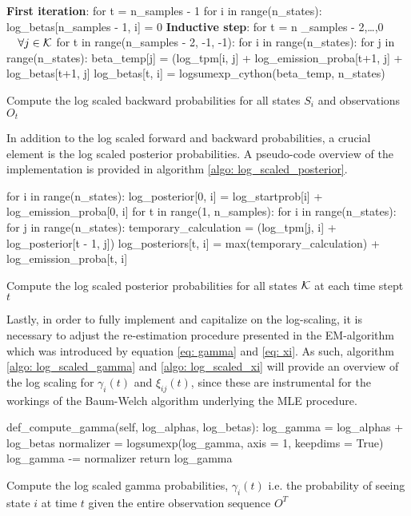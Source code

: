 \begin{algorithm}[H]
\textbf{First iteration}: for t = n\_samples - 1 \;
for i in range(n\_states): \;
\Indp
log\_betas[n\_samples - 1, i] = 0 \;
\BlankLine
\Indm
\textbf{Inductive step}: for t = n \_samples - 2,\ldots,0 $ \quad \forall j \in \operatorname{\mathcal{K}} $ \;
for t in range(n\_samples - 2, -1, -1): \;
\Indp 
for i in range(n\_states): \;
\Indp
for j in range(n\_states): \;
\Indp
beta\_temp[j] = (log\_tpm[i, j] + log\_emission\_proba[t+1, j] + log\_betas[t+1, j] \;
\BlankLine
\Indm
log\_betas[t, i] = logsumexp\_cython(beta\_temp, n\_states) \;
\caption{Compute the log scaled backward probabilities for all states $S_i$ and observations $O_t$}
\label{algo: log_scaled_backward}
\end{algorithm}

In addition to the log scaled forward and backward probabilities, a crucial element is the log scaled posterior probabilities. A pseudo-code overview of the implementation is provided in algorithm \ref{algo: log_scaled_posterior}.

\begin{algorithm}[H]
for i in range(n\_states): \;
\Indp 
log\_posterior[0, i] = log\_startprob[i] + log\_emission\_proba[0, i] \;
\Indm
for t in range(1, n\_samples): \;
\Indp
for i in range(n\_states): \;
\Indp
for j in range(n\_states): \;
\Indp
temporary\_calculation = (log\_tpm[j, i] + log\_posterior[t - 1, j]) \;
\Indm
log\_posteriors[t, i] = max(temporary\_calculation) + log\_emission\_proba[t, i] \;
\BlankLine
\caption{Compute the log scaled posterior probabilities for all states $\operatorname{\mathcal{K}}$ at each time stept $t$}
\label{algo: log_scaled_posterior}
\end{algorithm}

Lastly, in order to fully implement and capitalize on the log-scaling, it is necessary to adjust the re-estimation procedure presented in the EM-algorithm which was introduced by equation \ref{eq: gamma} and \ref{eq: xi}. As such, algorithm \ref{algo: log_scaled_gamma} and \ref{algo: log_scaled_xi} will provide an overview of the log scaling for $\gamma_i(t)$ and $\xi_{ij}(t)$, since these are instrumental for the workings of the Baum-Welch algorithm underlying the MLE procedure.

\begin{algorithm}[H]
def\_compute\_gamma(self, log\_alphas, log\_betas): \;
\Indp 
log\_gamma = log\_alphas + log\_betas \;
normalizer = logsumexp(log\_gamma, axis = 1, keepdims = True) \;
log\_gamma -= normalizer \;
\BlankLine
return log\_gamma
\caption{Compute the log scaled gamma probabilities, $\gamma_i(t)$ i.e. the probability of seeing state $i$ at time $t$ given the entire observation sequence $O^T$}
\label{algo: log_scaled_gamma}
\end{algorithm}

